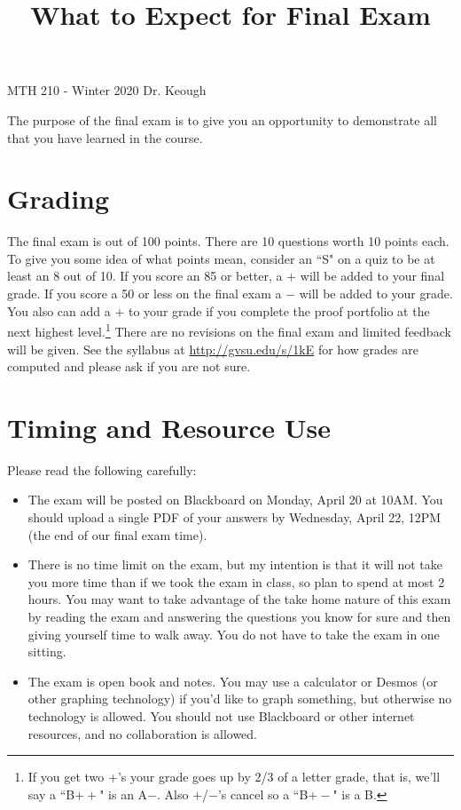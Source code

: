 \documentclass[12pt]{amsart}
\title{What to Expect for Final Exam
}
\theoremstyle{definition}
\begin{document}
MTH 210 - Winter 2020 \hfill Dr. Keough\\

\maketitle


\vspace{-.3in}

The purpose of the final exam is to give you an opportunity to demonstrate all that you have learned in the course.

\section{Grading}
The final exam is out of 100 points. There are 10 questions worth 10 points each. To give you some idea of what points mean, consider an ``S" on a quiz to be at least an 8 out of 10. If you score an 85 or better, a $+$ will be added to your final grade. If you score a 50 or less on the final exam a $-$ will be added to your grade. You also can add a $+$ to your grade if you complete the proof portfolio at the next highest level.\footnote{If you get two +'s your grade goes up by 2/3 of a letter grade, that is, we'll say a ``B$++$" is an A$-$. Also $+$/$-$'s cancel so a ``B$+-$" is a B.} There are no revisions on the final exam and limited feedback will be given. See the syllabus at \url{http://gvsu.edu/s/1kE} for how grades are computed and please ask if you are not sure.

\section{Timing and Resource Use}
Please read the following carefully:
\begin{itemize}
\item The exam will be posted on Blackboard on Monday, April 20 at 10AM. You should upload a single PDF of your answers by Wednesday, April 22, 12PM (the end of our final exam time). 
\item There is no time limit on the exam, but my intention is that it will not take you more time than if we took the exam in class, so plan to spend at most 2 hours. You may want to take advantage of the take home nature of this exam by reading the exam and answering the questions you know for sure and then giving yourself time to walk away. You do not have to take the exam in one sitting.
\item The exam is open book and notes.  You may use a calculator or Desmos (or other graphing technology) if you'd like to graph something, but otherwise no technology is allowed. You should not use Blackboard or other internet resources, and no collaboration is allowed. 
\end{itemize}
\end{document}

